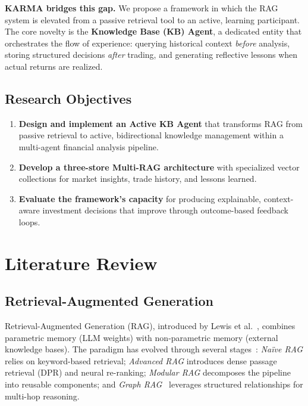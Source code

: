 \documentclass[conference]{IEEEtran}
\begin{document}
\textbf{KARMA bridges this gap.} We propose a framework in which the RAG system is elevated from a passive retrieval tool to an active, learning participant. The core novelty is the \textbf{Knowledge Base (KB) Agent}, a dedicated entity that orchestrates the flow of experience: querying historical context \textit{before} analysis, storing structured decisions \textit{after} trading, and generating reflective lessons when actual returns are realized.

\subsection{Research Objectives}

\begin{enumerate}
\item \textbf{Design and implement an Active KB Agent} that transforms RAG from passive retrieval to active, bidirectional knowledge management within a multi-agent financial analysis pipeline.
\item \textbf{Develop a three-store Multi-RAG architecture} with specialized vector collections for market insights, trade history, and lessons learned.
\item \textbf{Evaluate the framework's capacity} for producing explainable, context-aware investment decisions that improve through outcome-based feedback loops.
\end{enumerate}

\section{Literature Review}

\subsection{Retrieval-Augmented Generation}

Retrieval-Augmented Generation (RAG), introduced by Lewis et al.~\cite{lewis2020rag}, combines parametric memory (LLM weights) with non-parametric memory (external knowledge bases). The paradigm has evolved through several stages~\cite{gao2024ragsurvey}: \textit{Na\"ive RAG} relies on keyword-based retrieval; \textit{Advanced RAG} introduces dense passage retrieval (DPR) and neural re-ranking; \textit{Modular RAG} decomposes the pipeline into reusable components; and \textit{Graph RAG}~\cite{peng2024graphrag} leverages structured relationships for multi-hop reasoning.
\end{document}
